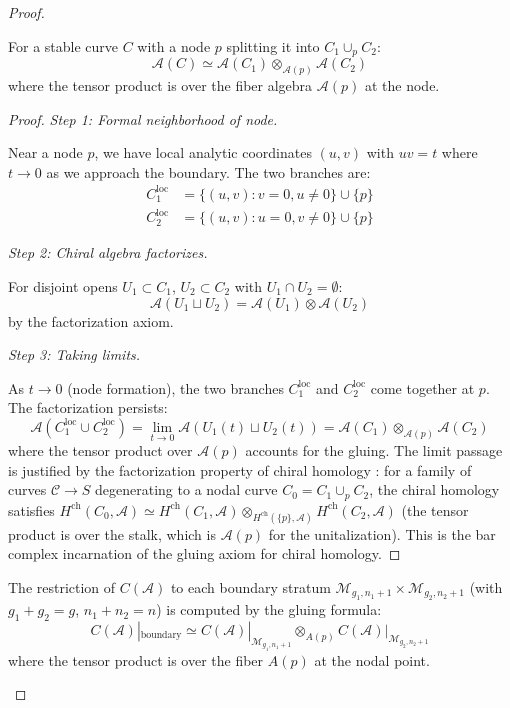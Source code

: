 \begin{proof}
\begin{proposition}\label{prop:gluing-at-nodes}
For a stable curve $C$ with a node $p$ splitting it into $C_1 \cup_p C_2$:
\[\mathcal{A}(C) \simeq \mathcal{A}(C_1) \otimes_{\mathcal{A}(p)} \mathcal{A}(C_2)\]
where the tensor product is over the fiber algebra $\mathcal{A}(p)$ at the node.
\end{proposition}

\begin{proof}
\emph{Step 1: Formal neighborhood of node.}

Near a node $p$, we have local analytic coordinates $(u,v)$ with $uv = t$ where $t \to 0$ as we approach the boundary. The two branches are:
\begin{align*}
C_1^{\text{loc}} &= \{(u, v) : v = 0, u \neq 0\} \cup \{p\} \\
C_2^{\text{loc}} &= \{(u, v) : u = 0, v \neq 0\} \cup \{p\}
\end{align*}

\emph{Step 2: Chiral algebra factorizes.}

For disjoint opens $U_1 \subset C_1$, $U_2 \subset C_2$ with $U_1 \cap U_2 = \emptyset$:
\[\mathcal{A}(U_1 \sqcup U_2) = \mathcal{A}(U_1) \otimes \mathcal{A}(U_2)\]
by the factorization axiom.

\emph{Step 3: Taking limits.}

As $t \to 0$ (node formation), the two branches $C_1^{\text{loc}}$ and $C_2^{\text{loc}}$ come together at $p$. The factorization persists:
\[\mathcal{A}(C_1^{\text{loc}} \cup C_2^{\text{loc}}) = \lim_{t \to 0} \mathcal{A}(U_1(t) \sqcup U_2(t)) = \mathcal{A}(C_1) \otimes_{\mathcal{A}(p)} \mathcal{A}(C_2)\]
where the tensor product over $\mathcal{A}(p)$ accounts for the gluing.  The limit passage is justified by the factorization property of chiral homology \cite[Theorem~3.4.9]{BD04}: for a family of curves $\mathcal{C} \to S$ degenerating to a nodal curve $C_0 = C_1 \cup_p C_2$, the chiral homology satisfies $H^{\mathrm{ch}}(C_0, \mathcal{A}) \simeq H^{\mathrm{ch}}(C_1, \mathcal{A}) \otimes_{H^{\mathrm{ch}}(\{p\}, \mathcal{A})} H^{\mathrm{ch}}(C_2, \mathcal{A})$ (the tensor product is over the stalk, which is $\mathcal{A}(p)$ for the unitalization).  This is the bar complex incarnation of the gluing axiom for chiral homology. \qedhere
\end{proof}

\begin{lemma}\label{lem:boundary-compatible}
The restriction of $C(\mathcal{A})$ to each boundary stratum 
$\mathcal{M}_{g_1,n_1+1} \times \mathcal{M}_{g_2,n_2+1}$ (with $g_1+g_2=g$, $n_1+n_2=n$) 
is computed by the gluing formula:
\[C(\mathcal{A})|_{\text{boundary}} \simeq C(\mathcal{A})|_{\mathcal{M}_{g_1,n_1+1}} 
\otimes_{A(p)} C(\mathcal{A})|_{\mathcal{M}_{g_2,n_2+1}}\]
where the tensor product is over the fiber $A(p)$ at the nodal point.
\end{lemma}


\end{proof}
